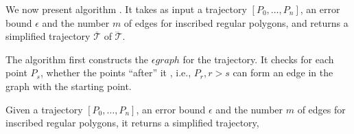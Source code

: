 
We now present algorithm \cisto. It takes as input a trajectory ${[P_0, \ldots, P_n]}$, an error bound $\epsilon$ and the number $m$ of edges for inscribed regular polygons, and returns a simplified  trajectory $\overline{\mathcal{T}}$ of $\dddot{\mathcal{T}}$.

The algorithm first  constructs the $\epsilon graph$ for the trajectory. It
checks for each point $P_s$, whether the points ``after'' it , i.e., $P_r,r > s$
can form an edge in the graph with the starting point. 

Given a trajectory ${[P_0, \ldots, P_n]}$, an error bound $\epsilon$ and the number $m$ of edges for inscribed
regular polygons, it returns a simplified trajectory,



